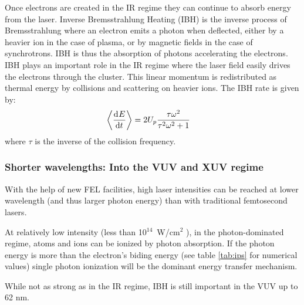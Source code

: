 
Once electrons are created in the IR regime they can continue to absorb energy
from the laser.
Inverse Bremsstrahlung Heating (IBH) is the inverse process of Bremsstrahlung
where an electron emits a photon when deflected, either by a heavier ion in the
case of plasma, or by magnetic fields in the case of synchrotrons. IBH is thus
the absorption of photons accelerating the electrons\cite{Schlessinger1979}.
IBH plays an important role in the IR regime where the laser field easily
drives the electrons through the cluster\cite{Fennel2010}.
This linear momentum
is redistributed as thermal energy by collisions and scattering on heavier ions.
The IBH rate is given\cite{Fennel2010} by:
\begin{align}
\left< \frac{\textrm{d}^{{}} {E}}{\textrm{d} t^{{}}} \right> & = 2 U_p \frac{\tau \omega^2}{\tau^2 \omega^2 + 1}
\end{align}
where $\tau$ is the inverse of the collision frequency.


\subsubsection{Shorter wavelengths: Into the VUV and XUV regime}
\label{section:intro:mechanisms:vuv}

With the help of new FEL facilities, high laser intensities can be reached at
lower wavelength (and thus larger photon energy) than with traditional
femtosecond lasers.

At relatively low intensity (less than 10$^{14}$~W/cm$^2$
\cite{Ramunno2008}), in the photon-dominated regime, atoms and ions
can be ionized by photon absorption. If the photon energy is more than the
electron's biding energy (see table \ref{tab:ips} for numerical values) single
photon ionization will be the dominant energy transfer mechanism.

While not as strong as in the IR regime, IBH is still important in the
VUV\cite{Krainov2000} up to 62 nm\cite{Georgescu2007}.


